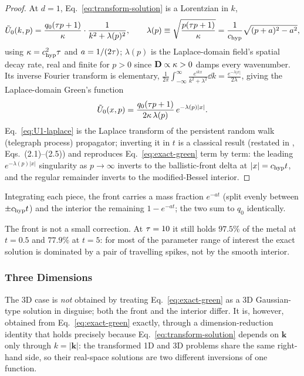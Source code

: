 \begin{proof}
At $d=1$, Eq.~\eqref{eq:transform-solution} is a Lorentzian in $k$,
\begin{equation}
  \tilde U_0(k,p) = \frac{q_0(\tau p+1)}{\kappa}\cdot\frac{1}{k^2+\lambda(p)^2} ,
  \qquad
  \lambda(p) \equiv \sqrt{\frac{p(\tau p+1)}{\kappa}} = \frac{1}{c_{\rm hyp}}\sqrt{(p+a)^2-a^2} ,
\end{equation}
using $\kappa=c_{\rm hyp}^2\tau$ and $a=1/(2\tau)$; $\lambda(p)$ is the
Laplace-domain field's spatial decay rate, real and finite for $p>0$ since
$\mathbf{D}\propto\kappa>0$ damps every wavenumber. Its inverse Fourier
transform is elementary,
$\tfrac1{2\pi}\int_{-\infty}^\infty\tfrac{e^{ikx}}{k^2+\lambda^2}\dd
k=\tfrac{e^{-\lambda|x|}}{2\lambda}$, giving the Laplace-domain Green's
function
\begin{equation}
  \label{eq:U1-laplace}
  \tilde U_0(x,p) = \frac{q_0(\tau p+1)}{2\kappa\,\lambda(p)}\,e^{-\lambda(p)|x|} .
\end{equation}
Eq.~\eqref{eq:U1-laplace} is the Laplace transform of the persistent
random walk (telegraph process) propagator; inverting it in $t$ is a
classical result \cite{MasoliverPorraWeiss1993} (restated in
\cite{PruestelMeierSchellersheim2013}, Eqs.~(2.1)--(2.5)) and reproduces
Eq.~\eqref{eq:exact-green} term by term: the leading $e^{-\lambda(p)|x|}$
singularity as $p\to\infty$ inverts to the ballistic-front delta at
$|x|=c_{\rm hyp} t$, and the regular remainder inverts to the modified-Bessel
interior.
\end{proof}

Integrating each piece, the front carries a mass fraction $e^{-at}$ (split
evenly between $\pm c_{\rm hyp} t$) and the interior the remaining $1-e^{-at}$;
the two sum to $q_0$ identically.

The front is not a small correction. At $\tau=10$ it still holds
$97.5\%$ of the metal at $t=0.5$ and $77.9\%$ at $t=5$: for most of the
parameter range of interest the exact solution is dominated by a pair of
travelling spikes, not by the smooth interior.

\subsubsection{Three Dimensions}
\label{sec:exact-3d}

The 3D case is \emph{not} obtained by treating Eq.~\eqref{eq:exact-green}
as a 3D Gaussian-type solution in disguise; both the front and the
interior differ. It is, however, obtained from
Eq.~\eqref{eq:exact-green} exactly, through a dimension-reduction identity
that holds precisely because Eq.~\eqref{eq:transform-solution} depends on
$\mathbf k$ only through $k=|\mathbf k|$: the transformed 1D and 3D
problems share the same right-hand side, so their real-space solutions
are two different inversions of one function.

